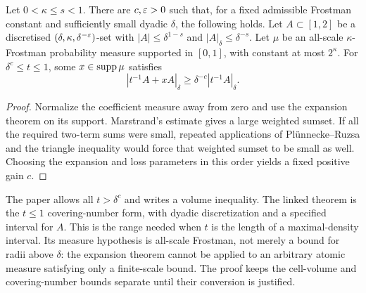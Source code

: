 \begin{proposition}
\label{prop:strong-ring}
\leanok
Let $0<\kappa\leq s<1$. There are $c,\varepsilon>0$ such that, for a
fixed admissible Frostman constant and sufficiently small dyadic
$\delta$, the following holds. Let $A\subset[1,2]$ be a
discretised $(\delta,\kappa,\delta^{-\varepsilon})$-set with
$|A|\leq\delta^{1-s}$ and $|A|_\delta\leq\delta^{-s}$.
Let $\mu$ be an all-scale $\kappa$-Frostman probability measure
supported in $[0,1]$, with constant at most $2^\kappa$.
For $\delta^c\leq t\leq1$, some $x\in\operatorname{supp}\mu$ satisfies
\[
             |t^{-1}A+xA|_\delta
                         \geq\delta^{-c}|t^{-1}A|_\delta.
\]
\end{proposition}
\begin{proof}
\leanok
Normalize the coefficient measure away from zero and use the
expansion theorem on its support. Marstrand's estimate gives a large
weighted sumset. If all the required two-term sums were small,
repeated applications of Pl\"unnecke--Ruzsa and the triangle
inequality would force that weighted sumset to be small as well.
Choosing the expansion and loss parameters in this order yields
a fixed positive gain $c$.
\end{proof}

\begin{remark}
\label{rem:strong-ring}
The paper allows all $t>\delta^c$ and writes a volume inequality.
The linked theorem is the $t\leq1$ covering-number form, with
dyadic discretization and a specified interval for $A$. This is the
range needed when $t$ is the length of a maximal-density interval.
Its measure hypothesis is all-scale Frostman, not merely a bound
for radii above $\delta$: the expansion theorem cannot be applied
to an arbitrary atomic measure satisfying only a finite-scale bound.
The proof keeps the cell-volume and covering-number bounds separate
until their conversion is justified.
\end{remark}

